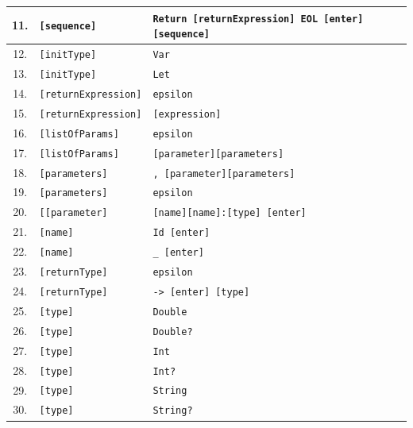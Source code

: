 \documentclass[a4paper, 11pt]{article}
\newcommand{\coloredtext}[1]{\textcolor{green!70!black}{#1}}
\begin{document}
\begin{table}[!ht]
\begin{tabular}{|c|p{}|p{11cm}|}
        \hline
        11. & \texttt{[sequence]} & \texttt{\coloredtext{Return} [returnExpression] \coloredtext{EOL} [enter] [sequence]} \\
        \hline
        12. & \texttt{[initType]} & \texttt{\coloredtext{Var}} \\
        \hline
        13. & \texttt{[initType]} & \texttt{\coloredtext{Let}} \\
        \hline
        14. & \texttt{[returnExpression]} & \texttt{\coloredtext{epsilon}} \\
        \hline
        15. & \texttt{[returnExpression]} & \texttt{[expression]} \\
        \hline
        16. & \texttt{[listOfParams]} & \texttt{\coloredtext{epsilon}} \\
        \hline
        17. & \texttt{[listOfParams]} & \texttt{[parameter][parameters]} \\
        \hline
        18. & \texttt{[parameters]} & \texttt{\coloredtext{,} [parameter][parameters]} \\
        \hline
        19. & \texttt{[parameters]} & \texttt{\coloredtext{epsilon}} \\
        \hline
        20. & \texttt{[[parameter]} & \texttt{[name][name]\coloredtext{:}[type] [enter]} \\
        \hline
        21. & \texttt{[name]} & \texttt{\coloredtext{Id} [enter]} \\
        \hline
        22. & \texttt{[name]} & \texttt{\coloredtext{\_} [enter]} \\
        \hline
        23. & \texttt{[returnType]} & \texttt{\coloredtext{epsilon}} \\
        \hline
        24. & \texttt{[returnType]} & \texttt{\coloredtext{->} [enter] [type]} \\
        \hline
        25. & \texttt{[type]} & \texttt{\coloredtext{Double}} \\
        \hline
        26. & \texttt{[type]} & \texttt{\coloredtext{Double?}} \\
        \hline
        27. & \texttt{[type]} & \texttt{\coloredtext{Int}} \\
        \hline
        28. & \texttt{[type]} & \texttt{\coloredtext{Int?}} \\
        \hline
        29. & \texttt{[type]} & \texttt{\coloredtext{String}} \\
        \hline
        30. & \texttt{[type]} & \texttt{\coloredtext{String?}} \\
        \hline

\end{tabular}
\end{table}
\end{document}
